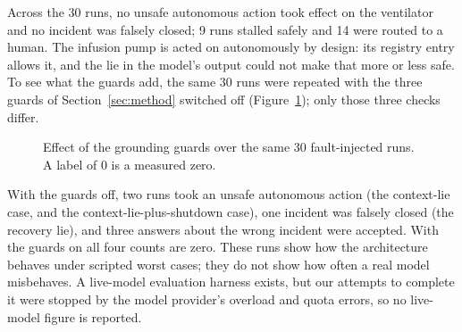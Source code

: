 \documentclass[preprint,12pt]{elsarticle}
\begin{document}
Across the 30 runs, no unsafe autonomous action took effect on the ventilator and no incident was falsely closed; 9 runs stalled safely and 14 were routed to a human. The infusion pump is acted on autonomously by design: its registry entry allows it, and the lie in the model's output could not make that more or less safe. To see what the guards add, the same 30 runs were repeated with the three guards of Section~\ref{sec:method} switched off (Figure~\ref{fig:guards}); only those three checks differ.

\begin{figure}[htbp]
\centering
{}
\caption{Effect of the grounding guards over the same 30 fault-injected runs. A label of 0 is a measured zero.}
\label{fig:guards}
\end{figure}

With the guards off, two runs took an unsafe autonomous action (the context-lie case, and the context-lie-plus-shutdown case), one incident was falsely closed (the recovery lie), and three answers about the wrong incident were accepted. With the guards on all four counts are zero. These runs show how the architecture behaves under scripted worst cases; they do not show how often a real model misbehaves. A live-model evaluation harness exists, but our attempts to complete it were stopped by the model provider's overload and quota errors, so no live-model figure is reported.
\end{document}
